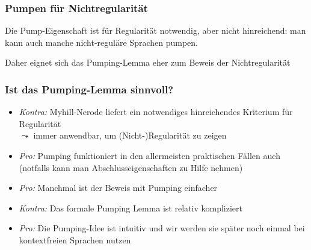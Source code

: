 \documentclass[aspectratio=1610,onlymath]{beamer}
\begin{document}
\begin{frame}[t]\frametitle{Pumpen für Nichtregularität}

Die Pump-Eigenschaft ist für Regularität \alert{notwendig}, aber \alert{nicht hinreichend}: man kann auch manche nicht-reguläre Sprachen pumpen.
\medskip

Daher eignet sich das Pumping-Lemma eher zum Beweis der Nichtregularität
\medskip\pause


\end{frame}


\begin{frame}\frametitle{Ist das Pumping-Lemma sinnvoll?}

\begin{itemize}
\item \emph{Kontra:} Myhill-Nerode liefert ein notwendiges  hinreichendes Kriterium für Regularität\\
$\leadsto$ immer anwendbar, um (Nicht-)Regularität zu zeigen
\item \emph{Pro:} Pumping funktioniert in den allermeisten praktischen Fällen auch\\
(notfalls kann man Abschlusseigenschaften zu Hilfe nehmen)
\item \emph{Pro:} Manchmal ist der Beweis mit Pumping einfacher
\item \emph{Kontra:} Das formale Pumping Lemma ist relativ kompliziert
\item \emph{Pro:} Die Pumping-Idee ist intuitiv und wir werden sie später noch einmal bei kontextfreien Sprachen nutzen
\end{itemize}

\end{frame}


\end{document}
